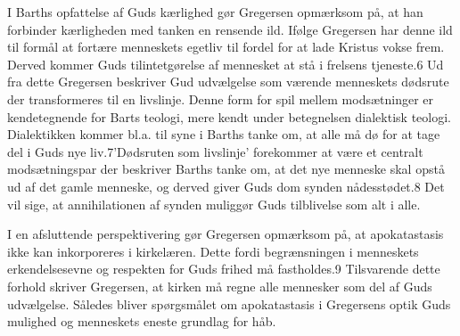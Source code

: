 I Barths opfattelse af Guds kærlighed gør Gregersen opmærksom på, at han forbinder kærligheden med tanken en rensende ild. Ifølge Gregersen har denne ild til formål at fortære menneskets egetliv til fordel for at lade Kristus vokse frem. Derved kommer Guds tilintetgørelse af mennesket at stå i frelsens tjeneste.6 Ud fra dette Gregersen beskriver Gud udvælgelse som værende menneskets dødsrute der transformeres til en livslinje. Denne form for spil mellem modsætninger er kendetegnende for Barts teologi, mere kendt under betegnelsen dialektisk teologi. Dialektikken kommer bl.a. til syne i Barths tanke om, at alle må dø for at tage del i Guds nye liv.7’Dødsruten som livslinje’ forekommer at være et centralt modsætningspar der beskriver Barths tanke om, at det nye menneske skal opstå ud af det gamle menneske, og derved giver Guds dom synden nådesstødet.8 Det vil sige, at annihilationen af synden muliggør Guds tilblivelse som alt i alle. 

I en afsluttende perspektivering gør Gregersen opmærksom på, at apokatastasis ikke kan inkorporeres i kirkelæren. Dette fordi begrænsningen i menneskets erkendelsesevne og respekten for Guds frihed må fastholdes.9 Tilsvarende dette forhold skriver Gregersen, at kirken må regne alle mennesker som del af Guds udvælgelse. Således bliver spørgsmålet om apokatastasis i Gregersens optik Guds mulighed og menneskets eneste grundlag for håb. 